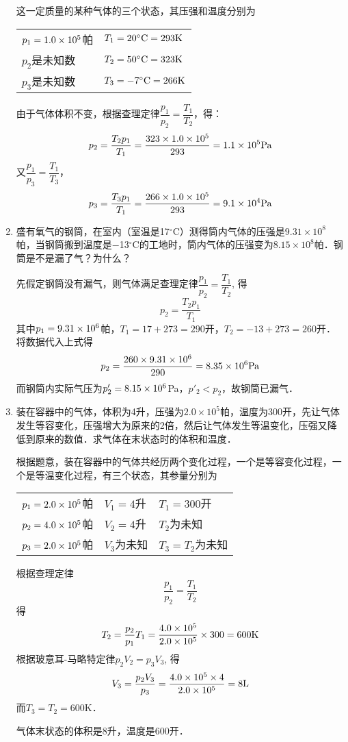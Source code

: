 \begin{enumerate}
\begin{solution}
 这一定质量的某种气体的三个状态，其压强和温度分别为
\begin{center}
\begin{tabular}{p{}p{}}
    $p_1=1.0\times10^5$帕 & $T_1=20^{\circ}{\rm C}=293{\rm K}$\\
    $p_2$是未知数& $T_2=50^{\circ}{\rm C}=323{\rm K}$\\
    $p_3$是未知数& $T_3=-7^{\circ}{\rm C}=266{\rm K}$\\
\end{tabular}
\end{center}
由于气体体积不变，根据查理定律$\dfrac{p_1}{p_2}=\dfrac{T_1}{T_2}$，得：
\[p_2=\frac{T_2p_1}{T_1}=\frac{323\times 1.0\times 10^5}{293}=1.1\times 10^5{\rm Pa}\]
又$\dfrac{p_1}{p_3}=\dfrac{T_1}{T_3}$，
\[p_3=\frac{T_3p_1}{T_1}=\frac{266\times 1.0\times 10^5}{293}=9.1\times 10^4{\rm Pa}\]
\end{solution}
\item 盛有氧气的钢筒，在室内（室温是17$^\circ$C）测得筒内气体的压强是$9.31\times 10^8$帕，当钢筒搬到温度是$-$13$^\circ$C的工地时，筒内气体的压强变为$8.15\times 10^8$帕．钢筒是不是漏了气？为什么？

\begin{solution}
先假定钢筒没有漏气，则气体满足查理定律$\dfrac{p_1}{p_2}=\dfrac{T_1}{T_2}$, 得
\[p_2=\frac{T_2p_1}{T_1}\]
其中$p_1=9.31\times10^6$帕，$T_1=17+273=290$开，$T_2=-13+273=260$开．
将数据代入上式得
\[p_2=\frac{260\times 9.31\times 10^6}{290}=8.35\times 10^6{\rm Pa}\]
而钢筒内实际气压为$p'_2=8.15\times 10^6$Pa，$p'_2<p_2$，故钢筒已漏气．
\end{solution}
\item 装在容器中的气体，体积为4升，压强为$2.0\times 10^5$帕，温度为300开，先让气体发生等容变化，压强增大为原来的2倍，然后让气体发生等温变化，压强又降低到原来的数值．求气体在末状态时的体积和温度．


\begin{solution}
根据题意，装在容器中的气体共经历两个变化过程，一个是等容变化过程，一个是等温变化过程，有三个状态，其参量分别为
\begin{center}
\begin{tabular}{p{}p{}p{}}
$p_1=2.0\times10^5$帕&$V_1=4$升& $T_1=300$开\\
$p_2=4.0\times10^5$帕& $V_2=4$升&$T_2$为未知\\
$p_3=2.0\times10^5$帕& $V_3$为未知& $T_3=T_2$为未知  \\
\end{tabular}
\end{center}

根据查理定律
\[\frac{p_1}{p_2}=\frac{T_1}{T_2}\]
得
\[T_2=\frac{p_2}{p_1}T_1=\frac{4.0\times10^5}{2.0\times10^5}\times 300=600{\rm K}\]
根据玻意耳-马略特定律$p_2V_2=p_3V_3$, 得
\[V_3=\frac{p_2V_3}{p_3}=\frac{4.0\times10^5\times 4}{2.0\times10^5}=8{\rm L}\]
而$T_3=T_2=600$K．

气体末状态的体积是8升，温度是600开．
\end{solution}
\end{enumerate}

